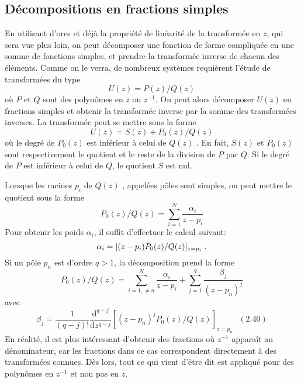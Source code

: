 \begin{proposition}
{\subsection{D\'{e}compositions en fractions simples}
En utilisant d'ores et d\'{e}j\`{a} la propri\'{e}t\'{e} de lin\'{e}arit\'{e} de la transform\'{e}e en $z$, qui sera vue plus loin, on peut d\'{e}composer une fonction de forme compliqu\'{e}e en une somme de fonctions simples, et prendre la transform\'{e}e inverse de chacun des \'{e}l\'{e}ments. Comme on le verra, de nombreux syst\`{e}mes requi\`{e}rent l'\'{e}tude de transform\'{e}es du type
\begin{equation}
\label{eq:definition-U}
U(z)=P(z)/Q(z)
\end{equation}
o\`{u} $P$ et $Q$ sont des polyn\^{o}mes en $z$ ou $z^{-1}$. On peut alors d\'{e}composer $U(z)$ en fractions simples et obtenir la transform\'{e}e inverse par la somme des transform\'{e}es inverses. La transform\'{e}e peut se mettre sous la forme
$$
U(z)=S(z)+P_{0}(z)/Q(z)
$$
o\`{u} le degr\'{e} de $P_{0}(z)$ est inf\'{e}rieur \`{a} celui de $Q(z)$ . En fait, $S(z)$ et $P_{0}(z)$ sont respectivement le quotient et le reste de la division de $P$ par $Q$. Si le degr\'{e} de $P$ est inf\'{e}rieur \`{a} celui de $Q$, le quotient $S$ est nul.

Lorsque les racines $p_{i}$ de $Q(z)$ , appel\'{e}es p\^{o}les sont simples, on peut mettre le quotient sous la forme
\begin{equation}
\label{eq:decomposition-pole-simple}
P_{0}(z)/Q(z)=\sum_{i=1}^{N}\frac{\alpha_{i}}{z-p_{i}}
\end{equation}
Pour obtenir les poids $\alpha_{i}$, il suffit d'effectuer le calcul suivant:
$$
\alpha_{i}=[(z-p_{i})P_{0}(z)/Q(z)]_{z=p_{i}} \;.
$$
Si un p\^{o}le $p_{n}$ est d'ordre $q>1$, la d\'{e}composition prend la forme
$$
P_{0}(z)/Q(z)=\sum_{i=1,\neq n}^{N}\frac{\alpha_{i}}{z-p_{i}}+\sum_{j=1}^{q}\frac{\beta_{j}}{(z-p_{n})^{j}}
$$
avec
$$
\beta_{j}=\frac{1}{(q-j)!}\frac{\mathrm{d}^{q-j}}{\mathrm{d}z^{q-j}}[(z-p_{n})^{j}P_{0}(z)/Q(z)]_{z=p_{n}}\text{   }(2.40)
$$
En r\'{e}alit\'{e}, il est plus int\'{e}ressant d'obtenir des fractions o\`{u} $z^{-1}$ apparaît au
d\'{e}nominateur, car les fractions dans ce cas correspondent directement \`{a} des
transform\'{e}es connues. D\`{e}s lors, tout ce qui vient d'\^{e}tre dit est appliqu\'{e} pour
des polyn\^{o}mes en $z^{-1}$ et non pas en $z$.

}
\end{proposition}

